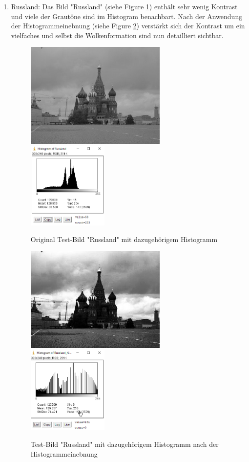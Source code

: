 \documentclass[12pt,german]{article}
\begin{document}
\begin{enumerate}
\item Russland: 
Das Bild "Russland"  (siehe Figure \ref{fig:Russland01}) enthält sehr wenig Kontrast und viele der Grautöne sind im Histogram benachbart. Nach der Anwendung der Histogrammeinebnung  (siehe Figure \ref{fig:Russland02}) verstärkt sich der Kontrast um ein vielfaches und selbst die Wolkenformation sind nun detailliert sichtbar.
\begin{figure}[H] \centering
	\includegraphics[width=7cm]{../testData/Results/Russland/Russland.jpg}
	\includegraphics[width=4cm]{../testData/Results/Russland/Russland-histogram.png}
	\caption{Original Test-Bild "Russland" mit dazugehörigem Histogramm}
	 \label{fig:Russland01}
\end{figure}
\begin{figure}[H] \centering
	\includegraphics[width=7cm]{../testData/Results/Russland/Russland-equalized.jpg}
	\includegraphics[width=4cm]{../testData/Results/Russland/Russland-equalized-histogram.png}
	\caption{Test-Bild "Russland" mit dazugehörigem Histogramm nach der Histogrammeinebnung}
	 \label{fig:Russland02}
\end{figure}


\end{enumerate}
\end{document}
